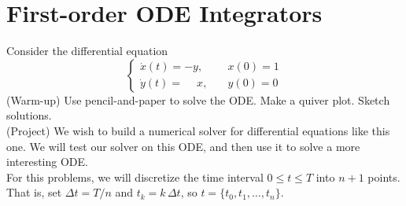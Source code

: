 
\section{First-order ODE Integrators}
Consider the differential equation
\begin{equation}
\label{eq:ode_system}
\begin{cases} \dot{x}(t) = -y, & \quad x(0) = 1\\ \dot{y}(t) = \phantom{-}x, & \quad y(0) = 0 \end{cases}
\end{equation}
(Warm-up) Use pencil-and-paper to solve the ODE. Make a quiver plot. Sketch solutions.\\
(Project) We wish to build a numerical solver for differential equations like this one. We will test our solver on this ODE, and then use it to solve a more interesting ODE.\\

For this problems, we will discretize the time interval $0 \leq t \leq T$ into $n+1$ points. That is, set $\Delta t = T/n$ and $t_k = k \, \Delta t$, so $ t = \{t_0, t_1, \dots, t_n\}$. 
